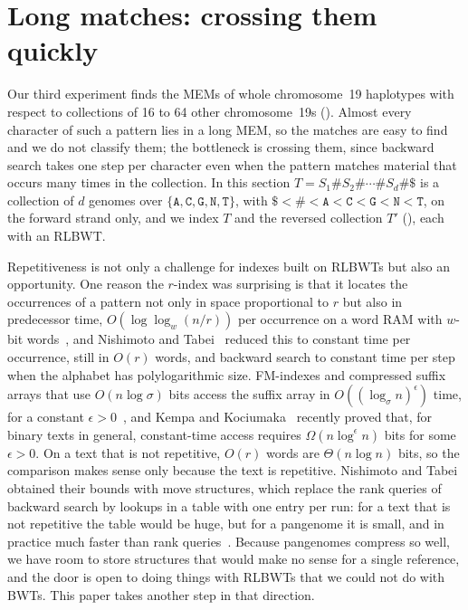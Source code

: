 \section{Long matches: crossing them quickly}
\label{sec:chr19}

Our third experiment finds the MEMs of whole chromosome~19 haplotypes
with respect to collections of 16 to 64 other chromosome~19s
(). Almost every character of such a pattern lies
in a long MEM, so the matches are easy to find and we do not classify
them; the bottleneck is crossing them, since backward search takes one
step per character even when the pattern matches material that occurs
many times in the collection. In this section $T = S_1 \# S_2 \# \cdots \#
S_d \# \$$ is a collection of $d$ genomes over
$\{\texttt{A},\texttt{C},\texttt{G},\texttt{N},\texttt{T}\}$, with $\$
< \# < \texttt{A} < \texttt{C} < \texttt{G} < \texttt{N} <
\texttt{T}$, on the forward strand only, and we index $T$ and the
reversed collection $T'$ (), each with an RLBWT.

Repetitiveness is not only a challenge for indexes built on RLBWTs but also an
opportunity. One reason the $r$-index was surprising is that it locates
the occurrences of a pattern not only in space proportional to $r$ but
also in predecessor time, $O(\log \log_w (n/r))$ per occurrence on a
word RAM with $w$-bit words~\cite{GagieNavarroPrezza2020}, and Nishimoto
and Tabei~\cite{NishimotoTabei2021} reduced this to constant time per
occurrence, still in $O(r)$ words, and backward search to constant time
per step when the alphabet has polylogarithmic size. FM-indexes and
compressed suffix arrays that use $O(n \log \sigma)$ bits access the
suffix array in $O((\log_\sigma n)^\epsilon)$ time, for a constant
$\epsilon > 0$~\cite{FerraginaManzini2000,GrossiVitter2005}, and Kempa and
Kociumaka~\cite{KempaKociumaka2026} recently proved that, for binary
texts in general, constant-time access requires $\Omega(n \log^\epsilon
n)$ bits for some $\epsilon > 0$. On a text that is not repetitive,
$O(r)$ words are $\Theta(n \log n)$ bits, so the comparison makes sense
only because the text is repetitive. Nishimoto and Tabei obtained their
bounds with move structures, which replace the rank queries of backward
search by lookups in a table with one entry per run: for a text that is
not repetitive the table would be huge, but for a pangenome it is
small, and in practice much faster than rank
queries~\cite{ZakeriEtAl2024}. Because pangenomes compress so well, we
have room to store structures that would make no sense for a single
reference, and the door is open to doing things with RLBWTs that we
could not do with BWTs. This paper takes another step in that
direction.

